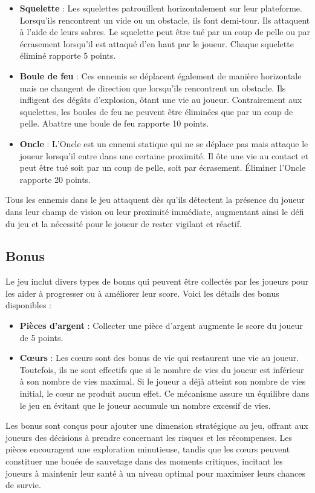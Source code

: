 \documentclass[a4paper,12pt]{article}
\begin{document}
\begin{itemize}
    \item \textbf{Squelette} : Les squelettes patrouillent horizontalement sur leur plateforme. Lorsqu'ils rencontrent un vide ou un obstacle, ils font demi-tour. Ils attaquent à l'aide de leurs sabres. Le squelette peut être tué par un coup de pelle ou par écrasement lorsqu'il est attaqué d'en haut par le joueur. Chaque squelette éliminé rapporte 5 points.
    
    \item \textbf{Boule de feu} : Ces ennemis se déplacent également de manière horizontale mais ne changent de direction que lorsqu'ils rencontrent un obstacle. Ils infligent des dégâts d'explosion, ôtant une vie au joueur. Contrairement aux squelettes, les boules de feu ne peuvent être éliminées que par un coup de pelle. Abattre une boule de feu rapporte 10 points.
    
    \item \textbf{Oncle} : L'Oncle est un ennemi statique qui ne se déplace pas mais attaque le joueur lorsqu'il entre dans une certaine proximité. Il ôte une vie au contact et peut être tué soit par un coup de pelle, soit par écrasement. Éliminer l'Oncle rapporte 20 points.
\end{itemize}

Tous les ennemis dans le jeu attaquent dès qu'ils détectent la présence du joueur dans leur champ de vision ou leur proximité immédiate, augmentant ainsi le défi du jeu et la nécessité pour le joueur de rester vigilant et réactif.

\subsection{Bonus}

Le jeu inclut divers types de bonus qui peuvent être collectés par les joueurs pour les aider à progresser ou à améliorer leur score. Voici les détails des bonus disponibles :

\begin{itemize}
    \item \textbf{Pièces d'argent} : Collecter une pièce d'argent augmente le score du joueur de 5 points.

    \item \textbf{Cœurs} : Les cœurs sont des bonus de vie qui restaurent une vie au joueur. Toutefois, ils ne sont effectifs que si le nombre de vies du joueur est inférieur à son nombre de vies maximal. Si le joueur a déjà atteint son nombre de vies initial, le cœur ne produit aucun effet. Ce mécanisme assure un équilibre dans le jeu en évitant que le joueur accumule un nombre excessif de vies.
\end{itemize}

Les bonus sont conçus pour ajouter une dimension stratégique au jeu, offrant aux joueurs des décisions à prendre concernant les risques et les récompenses. Les pièces encouragent une exploration minutieuse, tandis que les cœurs peuvent constituer une bouée de sauvetage dans des moments critiques, incitant les joueurs à maintenir leur santé à un niveau optimal pour maximiser leurs chances de survie.
\end{document}
